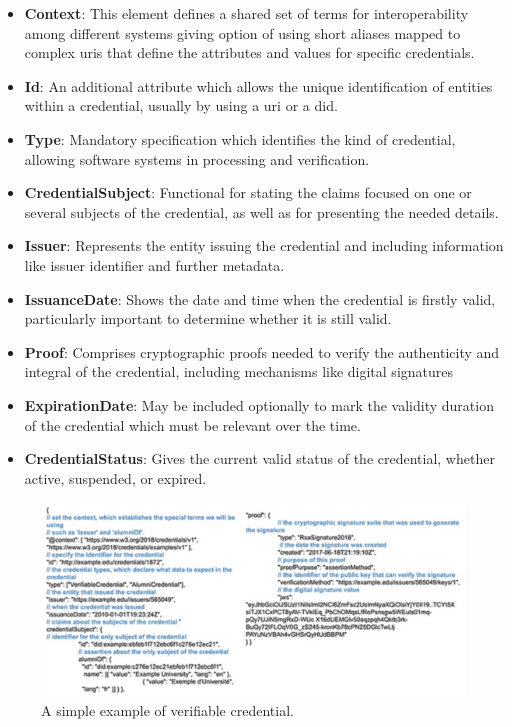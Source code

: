 \begin{itemize}
  \item \textbf{Context}: This element defines a shared set of terms for interoperability among different systems giving option of using short aliases mapped to complex 
  \gls{uri}s that define the attributes and values for specific credentials.
  \item \textbf{Id}: An additional attribute which allows the unique identification of entities within a credential, usually by using a \gls{uri} or a \gls{did}.
  \item \textbf{Type}: Mandatory specification which identifies the kind of credential, allowing software systems in processing and verification.
  \item \textbf{CredentialSubject}: Functional for stating the claims focused on one or several subjects of the credential, as well as for presenting the needed details.
  \item \textbf{Issuer}: Represents the entity issuing the credential and including information like issuer identifier and further metadata.
  \item \textbf{IssuanceDate}: Shows the date and time when the credential is firstly valid, particularly important to determine whether it is still valid.
  \item \textbf{Proof}: Comprises cryptographic proofs needed to verify the authenticity and integral of the credential, including mechanisms like digital signatures
  \item \textbf{ExpirationDate}: May be included optionally to mark the validity duration of the credential which must be relevant over the time.
  \item \textbf{CredentialStatus}: Gives the current valid status of the credential, whether active, suspended, or expired.
\end{itemize}

\begin{figure}[h]  
  \centering
  \includegraphics[width=1\textwidth]{Images/c4_3.png} 
  \caption{A simple example of verifiable credential.}
\end{figure}

